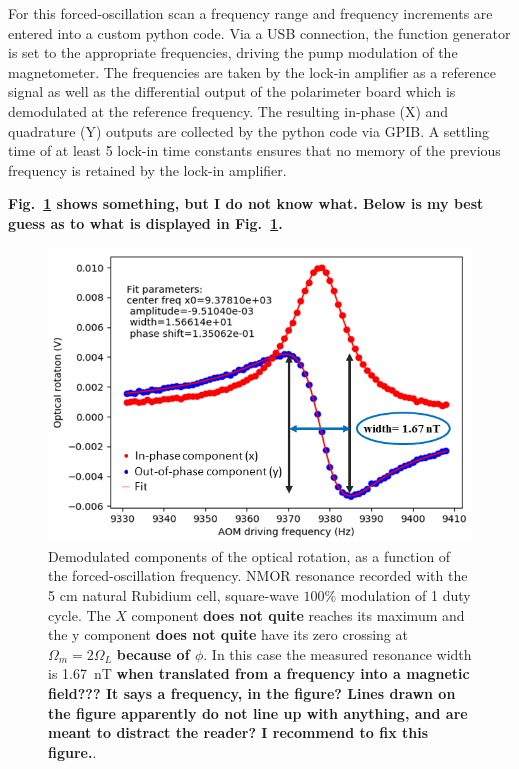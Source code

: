 For this forced-oscillation scan a frequency range and frequency
increments are entered into a custom python code. Via a USB
connection, the function generator is set to the appropriate
frequencies, driving the pump modulation of the magnetometer. The
frequencies are taken by the lock-in amplifier as a reference signal
as well as the differential output of the polarimeter board which is
demodulated at the reference frequency. The resulting in-phase (X) and
quadrature (Y) outputs are collected by the python code via GPIB.  A
settling time of at least 5 lock-in time constants ensures that no
memory of the previous frequency is retained by the lock-in amplifier.
\




{\bf Fig.~\ref{fig:FMOR} shows something, but I do not know what.
  Below is my best guess as to what is displayed in
  Fig.~\ref{fig:FMOR}.}

\begin{figure}[h]
\centering\includegraphics[width=0.5\linewidth]{figures/FM_modulation}
\caption{Demodulated components of the optical rotation, as a function
  of the forced-oscillation frequency.  NMOR resonance recorded with
  the 5 cm natural Rubidium cell, square-wave $100\%$ modulation of 1
  duty cycle. The $X$ component {\bf does not quite} reaches its
  maximum and the y component {\bf does not quite} have its zero
  crossing at $\Omega_m=2\Omega_L$ {\bf because of $\phi$}.  In this
  case the measured resonance width is 1.67~nT {\bf when translated
    from a frequency into a magnetic field???  It says a frequency, in
    the figure?  Lines drawn on the figure apparently do not line up
    with anything, and are meant to distract the
    reader?  I recommend to fix this figure.}.\label{fig:FMOR}}
\end{figure} 

